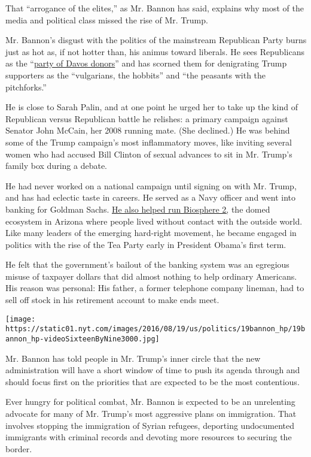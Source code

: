 That ``arrogance of the elites,'' as Mr. Bannon has said, explains why
most of the media and political class missed the rise of Mr. Trump.

Mr. Bannon's disgust with the politics of the mainstream Republican
Party burns just as hot as, if not hotter than, his animus toward
liberals. He sees Republicans as the
``\href{http://www.breitbart.com/big-government/2016/02/10/trump-senior-adviser-this-is-a-political-earthquake/}{party
of Davos donors}'' and has scorned them for denigrating Trump supporters
as the ``vulgarians, the hobbits'' and ``the peasants with the
pitchforks.''

He is close to Sarah Palin, and at one point he urged her to take up the
kind of Republican versus Republican battle he relishes: a primary
campaign against Senator John McCain, her 2008 running mate. (She
declined.) He was behind some of the Trump campaign's most inflammatory
moves, like inviting several women who had accused Bill Clinton of
sexual advances to sit in Mr. Trump's family box during a debate.

He had never worked on a national campaign until signing on with Mr.
Trump, and has had eclectic taste in careers. He served as a Navy
officer and went into banking for Goldman Sachs.
\href{https://www.youtube.com/watch?v=l_gkBPlLcfQ}{He also helped run
Biosphere 2,} the domed ecosystem in Arizona where people lived without
contact with the outside world. Like many leaders of the emerging
hard-right movement, he became engaged in politics with the rise of the
Tea Party early in President Obama's first term.

He felt that the government's bailout of the banking system was an
egregious misuse of taxpayer dollars that did almost nothing to help
ordinary Americans. His reason was personal: His father, a former
telephone company lineman, had to sell off stock in his retirement
account to make ends meet.

\texttt{[image: https://static01.nyt.com/images/2016/08/19/us/politics/19bannon\_hp/19bannon\_hp-videoSixteenByNine3000.jpg]}

Mr. Bannon has told people in Mr. Trump's inner circle that the new
administration will have a short window of time to push its agenda
through and should focus first on the priorities that are expected to be
the most contentious.

Ever hungry for political combat, Mr. Bannon is expected to be an
unrelenting advocate for many of Mr. Trump's most aggressive plans on
immigration. That involves stopping the immigration of Syrian refugees,
deporting undocumented immigrants with criminal records and devoting
more resources to securing the border.

